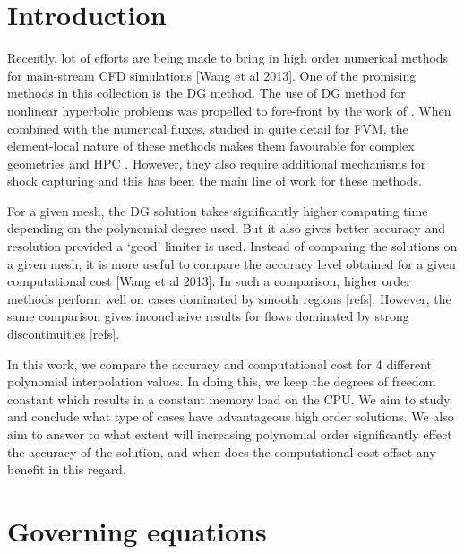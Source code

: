 \documentclass[a4paper,11pt,oneside]{article}
\newcommand{\citear}[1]{\citeauthor{#1} \cite{#1}} %
\begin{document}
\onehalfspacing %
\raggedbottom %

\tableofcontents



\section{Introduction}
\label{sec:intro}

Recently, lot of efforts are being made to bring in high order numerical methods for main-stream CFD simulations [Wang et al 2013]. One of the promising methods in this collection is the DG method. The use of DG method for nonlinear hyperbolic problems was propelled to fore-front by the work of \citear{cockburnShu1998a}. When combined with the numerical fluxes, studied in quite detail for FVM, the element-local nature of these methods makes them favourable for complex geometries and HPC \cite{cockburnShu2001}. However, they also require additional mechanisms for shock capturing and this has been the main line of work for these methods.

For a given mesh, the DG solution takes significantly higher computing time depending on the polynomial degree used. But it also gives better accuracy and resolution provided a `good' limiter is used. Instead of comparing the solutions on a given mesh, it is more useful to compare the accuracy level obtained for a given computational cost [Wang et al 2013]. In such a comparison, higher order methods perform well on cases dominated by smooth regions [refs]. However, the same comparison gives inconclusive results for flows dominated by strong discontinuities [refs].

In this work, we compare the accuracy and computational cost for 4 different polynomial interpolation values. In doing this, we keep the degrees of freedom constant which results in a constant memory load on the CPU. We aim to study and conclude what type of cases have advantageous high order solutions. We also aim to answer to what extent will increasing polynomial order significantly effect the accuracy of the solution, and when does the computational cost offset any benefit in this regard.



\section{Governing equations}
\label{sec:gov-eq}
\end{document}
